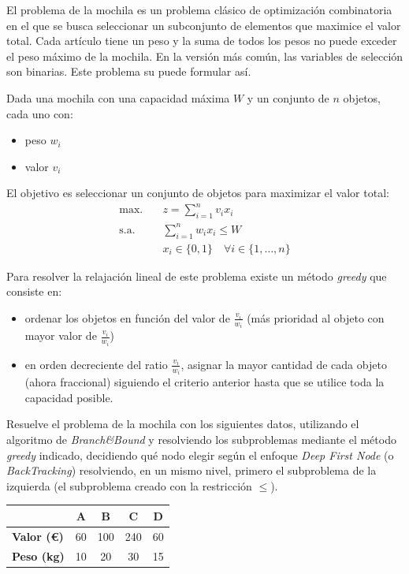 El problema de la mochila es un problema clásico de optimización combinatoria en el que se busca seleccionar un subconjunto de elementos que maximice el valor total. Cada artículo tiene un peso  y la suma de todos los pesos no puede exceder el peso máximo de la mochila. En la versión más común, las variables de selección son binarias. Este problema su puede formular así.

\vspace{0.5cm}
Dada una mochila con una capacidad máxima $W$ y un conjunto de $n$ objetos, cada uno con:
\begin{itemize}
    \item peso $w_i$
    \item valor $v_i$ 
\end{itemize}

El objetivo es seleccionar un conjunto de objetos para maximizar el valor total: 
\begin{align*}
\text{max.} \quad & z = \sum_{i=1}^{n} v_i x_i \\
\text{s.a.} \quad & \sum_{i=1}^{n} w_i x_i \leq W \\
                 & x_i \in \{0,1\} \quad \forall i \in \{1, \dots, n\}
\end{align*}


Para resolver la relajación lineal de este problema existe un método \textit{greedy}  que consiste en:
\begin{itemize}
    \item ordenar los objetos en función del valor de $\frac{v_i}{w_i}$ (más prioridad al objeto con mayor valor de $\frac{v_i}{w_i}$)
    \item en orden decreciente del ratio $\frac{v_i}{w_i}$, asignar la mayor cantidad de cada objeto (ahora fraccional) siguiendo el criterio anterior hasta que se utilice toda la capacidad posible.
\end{itemize}

\vspace{1cm}

Resuelve el problema de la mochila con los siguientes datos, utilizando el algoritmo de \textit{Branch\&Bound} y resolviendo los subproblemas mediante el método \textit{greedy} indicado, decidiendo qué nodo elegir según el enfoque \textit{Deep First Node} (o \textit{BackTracking}) resolviendo, en un mismo nivel, primero el subproblema de la izquierda (el subproblema creado con la restricción $\leq$).
\vspace{0.5cm}

\begin{tabular}{|l|c|c|c|c|}
\hline
\textbf{} & \textbf{A} & \textbf{B} & \textbf{C} & \textbf{D} \\
\hline
\textbf{Valor (€)} & 60 & 100 & 240 & 60 \\
\hline
\textbf{Peso (kg)} & 10 & 20 & 30 & 15 \\
\hline
\end{tabular}

